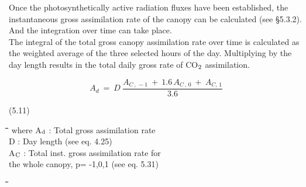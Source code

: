 \documentclass[11pt]{article}
\begin{document}
\bigskip
\bigskip
Once the photosynthetically active radiation fluxes have been established, the instanta\-neous gross assimilation rate of the canopy can be calculated (see \S 5.3.2). And the
integration over time can take place.\\
The integral of the total gross canopy assimilation rate over time is calculated as the
weighted average of the three selected hours of the day. Multiply\-ing by the day length
results in the total daily gross rate of CO$_{{\rm 2}}$ assimilation. 

\begin{displaymath}
A _{d} ~=~D~{\frac{A _{C\, ,\, -1} ~+~ 1.6\, A _{C\, ,\, 0} ~+~ A _{C,\, 1} }{3.6}}
\end{displaymath}

\bigskip
\strut\hfill (5.11)
\nwln
\begin{tabbing}
\hspace{1.27cm}\=\hspace{1.27cm}\=\hspace{1.27cm}\=\hspace{1.27cm}\=%
\hspace{1.27cm}\=\hspace{1.27cm}\=\hspace{1.27cm}\=\hspace{1.27cm}\=%
\hspace{1.27cm}\=\hspace{1.27cm}\=\kill
where\> A$_{{\rm d}}$\> : Total gross assimilation rate\> \> \> \> \> \> \> \> [kg ha$^{{\rm -1}}$ d$^{{\rm -1}}$]\\
\>D\> : Day length (see eq. 4.25)\> \> \> \> \> \> \> \> [h]\\
\>A$_{{\rm C}}$\> : Total inst. gross assimila\-tion rate for\\
\>\>   the whole canopy, p= -1,0,1 (see eq. 5.31)\> \> \> \> \> \> \> \> [kg ha$^{{\rm -1}}$ h$^{{\rm -1}}$]\\
\>\>   
\end{tabbing}

\nwln
\begin{tabbing}
\hspace{1.27cm}\=\hspace{1.27cm}\=\hspace{1.27cm}\=\hspace{1.27cm}\=%
\hspace{1.27cm}\=\hspace{1.27cm}\=\hspace{1.27cm}\=\hspace{1.27cm}\=%
\hspace{1.27cm}\=\hspace{1.27cm}\=\kill
\>\> 
\end{tabbing}
\end{document}
